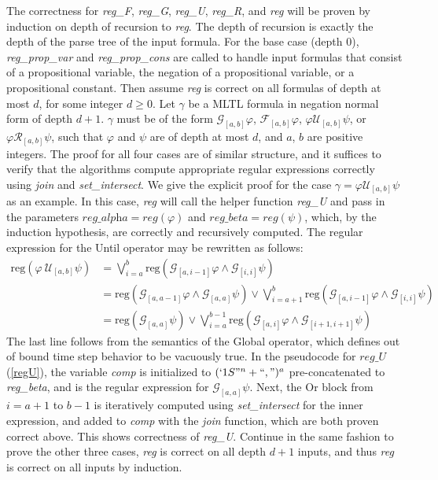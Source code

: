 \documentclass[runningheads]{llncs}
\renewcommand{\phi}{\varphi}
\begin{document}
The correctness for \textit{reg\_F}, \textit{reg\_G}, \textit{reg\_U}, \textit{reg\_R}, and \textit{reg} will be proven by induction on depth of recursion to \textit{reg}. 
The depth of recursion is exactly the depth of the parse tree of the input formula.
For the base case (depth $0$), \textit{reg\_prop\_var} and \textit{reg\_prop\_cons} are called to handle input formulas that consist of a propositional variable, the negation of a propositional variable, or a propositional constant.
Then assume \textit{reg} is correct on all formulas of depth at most $d$, for some integer $d \geq 0$. Let $\gamma$ be a MLTL formula in negation normal form of depth $d + 1$. $\gamma$ must be of the form $\mathcal{G}_{[a,b]}\phi$, $\mathcal{F}_{[a,b]}\phi$, $\phi \mathcal{U}_{[a,b]} \psi$, or $\phi \mathcal{R}_{[a,b]} \psi$, such that $\phi$ and $\psi$ are of depth at most $d$, and $a$, $b$ are positive integers. The proof for all four cases are of similar structure, and it suffices to verify that the algorithms compute appropriate regular expressions correctly using \textit{join} and \textit{set\_intersect}.
We give the explicit proof for the case $\gamma = \phi \mathcal{U}_{[a,b]} \psi$ as an example.
In this case, \textit{reg} will call the helper function \textit{reg\_U} and pass in the parameters $\textit{reg\_alpha} = \textit{reg}(\phi)$ and $\textit{reg\_beta} = \textit{reg}(\psi)$, which, by the induction hypothesis, are correctly and recursively computed.
The regular expression for the Until operator may be rewritten as follows: 
\begin{align*}
   \text{reg}(\phi \ \mathcal{U}_{[a,b]} \psi) &=  \bigvee_{i=a}^{b} \text{reg}\left(\mathcal{G}_{[a,i-1]}\phi \land \mathcal{G}_{[i, i]} \psi\right) \\
   &= \text{reg}\left(\mathcal{G}_{[a,a-1]}\phi \land \mathcal{G}_{[a, a]} \psi\right) \lor \bigvee_{i=a+1}^{b} \text{reg}\left(\mathcal{G}_{[a,i-1]}\phi \land \mathcal{G}_{[i, i]} \psi\right) \\
   &= \text{reg}\left(\mathcal{G}_{[a, a]} \psi \right)\lor \bigvee_{i=a}^{b-1} \text{reg}\left(\mathcal{G}_{[a,i]}\phi \land \mathcal{G}_{[i+1, i+1]} \psi\right)
\end{align*}
The last line follows from the semantics of the Global operator, which defines out of bound time step behavior to be vacuously true. In the pseudocode for $reg\_U$ (\ref{regU}), the variable \textit{comp} is initialized to $(`1S"^n + ``,")^a$ pre-concatenated to \textit{reg\_beta}, and is the regular expression for $\mathcal{G}_[a, a] \psi$. Next, the Or block from $i = a + 1$ to $b - 1$ is iteratively computed using \textit{set\_intersect} for the inner expression, and added to \textit{comp} with the \textit{join} function, which are both proven correct above. This shows correctness of \textit{reg\_U}.
Continue in the same fashion to prove the other three cases, \textit{reg} is correct on all depth $d+1$ inputs, and thus \textit{reg} is correct on all inputs by induction.
\end{document}
